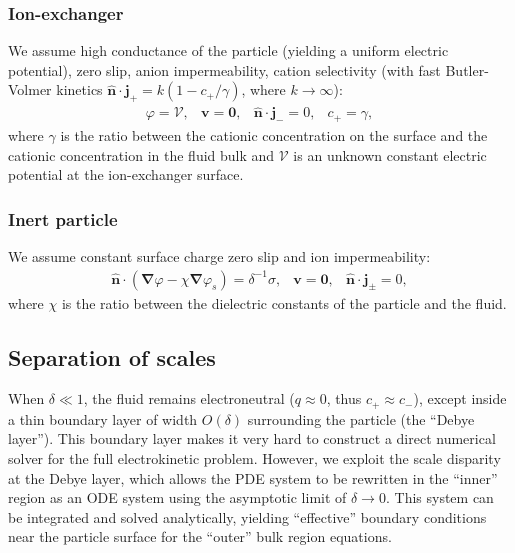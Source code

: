 \documentclass[10pt]{ijnam}
\newcommand\bnabla{\boldsymbol{\nabla}}
\newcommand\bv{\boldsymbol{v}}
\newcommand\bn{\boldsymbol{\hat{n}}}
\newcommand\bj{\boldsymbol{j}}
\newcommand\bzero{\boldsymbol{0}}
\newcommand\cV{\mathscr{V}}
\begin{document}
\subsubsection{Ion-exchanger \cite{yariv2010migration}}
We assume high conductance of the particle (yielding a uniform electric potential),
zero slip, anion impermeability, cation selectivity 
(with fast Butler-Volmer\cite{bard2000book} kinetics
$\bn \cdot \bj_+ = k (1 - c_+/\gamma)$, where $k \rightarrow \infty$):
\begin{equation}
\begin{array}{cccc}
\varphi = \cV, &
\bv = \bzero, &
\bn \cdot \bj_- = 0, &
c_+ = \gamma,
\end{array}
\end{equation}
where $\gamma$ is the ratio between the cationic concentration on the surface and the cationic
concentration in the fluid bulk and $\cV$ is an unknown constant electric potential at
the ion-exchanger surface. 

\subsubsection{Inert particle \cite{schnitzer2012surface}}
We assume constant surface charge
zero slip and ion impermeability:
\begin{equation}
\begin{array}{cccc}
\bn \cdot (\bnabla \varphi - \chi \bnabla \varphi_s) = \delta^{-1} \sigma, &
\bv = \bzero, &
\bn \cdot \bj_\pm = 0,
\end{array}
\end{equation}
where $\chi$ is the ratio between the dielectric constants of the 
particle and the fluid.

\subsection{Separation of scales}
When $\delta \ll 1$, 
the fluid remains electroneutral ($q \approx 0$, thus $c_+ \approx c_-$), 
except inside a thin boundary layer of width $O(\delta)$ 
surrounding the particle (the ``Debye layer'').
This boundary layer makes it very hard to construct 
a direct numerical solver for the full electrokinetic problem.
However, we exploit the scale disparity at the Debye layer, 
which allows the PDE system to be rewritten in the ``inner'' region 
as an ODE system using the asymptotic limit of $\delta \rightarrow 0$.
This system can be integrated and solved analytically,
yielding ``effective'' boundary conditions near
the particle surface for the ``outer'' bulk region equations.
\end{document}
